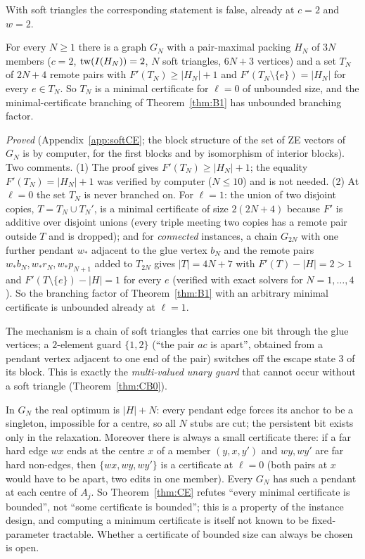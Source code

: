 With soft triangles the corresponding statement is false, already at $c=2$ and $w=2$.
\begin{theorem}\label{thm:CE}
For every $N\ge1$ there is a graph $G_N$ with a pair-maximal packing $H_N$ of $3N$ members ($c=2$, $\mathrm{tw}(I(H_N))=2$, $N$ soft triangles, $6N+3$ vertices) and a set $T_N$ of $2N+4$ remote pairs with $F'(T_N)\ge|H_N|+1$ and $F'(T_N\setminus\{e\})=|H_N|$ for every $e\in T_N$. So $T_N$ is a minimal certificate for $\ell=0$ of unbounded size, and the minimal-certificate branching of Theorem~\ref{thm:B1} has unbounded branching factor.
\end{theorem}
\emph{Proved} (Appendix~\ref{app:softCE}; the block structure of the set of ZE vectors of $G_N$ is by computer, for the first blocks and by isomorphism of interior blocks). Two comments. (1) The proof gives $F'(T_N)\ge|H_N|+1$; the equality $F'(T_N)=|H_N|+1$ was verified by computer ($N\le10$) and is not needed. (2) At $\ell=0$ the set $T_N$ is never branched on. For $\ell=1$: the union of two disjoint copies, $T=T_N\cup T_N'$, is a minimal certificate of size $2(2N+4)$ because $F'$ is additive over disjoint unions (every triple meeting two copies has a remote pair outside $T$ and is dropped); and for \emph{connected} instances, a chain $G_{2N}$ with one further pendant $w_*$ adjacent to the glue vertex $b_N$ and the remote pairs $w_*b_N,w_*r_N,w_*p_{N+1}$ added to $T_{2N}$ gives $|T|=4N+7$ with $F'(T)-|H|=2>1$ and $F'(T\setminus\{e\})-|H|=1$ for every $e$ (verified with exact solvers for $N=1,\dots,4$). So the branching factor of Theorem~\ref{thm:B1} with an arbitrary minimal certificate is unbounded already at $\ell=1$.

The mechanism is a chain of soft triangles that carries one bit through the glue vertices; a $2$-element guard $\{1,2\}$ (``the pair $ac$ is apart'', obtained from a pendant vertex adjacent to one end of the pair) switches off the escape state $3$ of its block. This is exactly the \emph{multi-valued unary guard} that cannot occur without a soft triangle (Theorem~\ref{thm:CB0}).
\begin{remark}\label{rem:mincert}
In $G_N$ the real optimum is $|H|+N$: every pendant edge forces its anchor to be a singleton, impossible for a centre, so all $N$ stubs are cut; the persistent bit exists only in the relaxation. Moreover there is always a small certificate there: if a far hard edge $wx$ ends at the centre $x$ of a member $(y,x,y')$ and $wy,wy'$ are far hard non-edges, then $\{wx,wy,wy'\}$ is a certificate at $\ell=0$ (both pairs at $x$ would have to be apart, two edits in one member). Every $G_N$ has such a pendant at each centre of $A_j$. So Theorem~\ref{thm:CE} refutes ``every minimal certificate is bounded'', not ``some certificate is bounded''; this is a property of the instance design, and computing a minimum certificate is itself not known to be fixed-parameter tractable. Whether a certificate of bounded size can always be chosen is open.
\end{remark}

